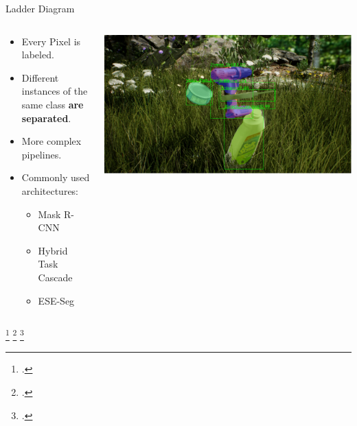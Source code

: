 \documentclass[18pt]{beamer}
\begin{document}
\begin{frame}{Ladder Diagram}
\begin{columns}
	\begin{column}{0.5\textwidth}
		\begin{itemize}
			\item Every Pixel is labeled.
			\item Different instances of the same class \textbf{are separated}.
			\item More complex pipelines.
			\item Commonly used architectures:
			\begin{itemize}
				\item Mask R-CNN~\footnotemark
				\item Hybrid Task Cascade~\footnotemark
				\item ESE-Seg~\footnotemark
			\end{itemize}
		\end{itemize}
	\end{column}
	\begin{column}{0.5\textwidth}
		\includegraphics[width=\textwidth]{figures/cmrcnn_mobilenet_fat.pdf}
	\end{column}
\end{columns}
\footcitetext{DBLP:journals/corr/HeGDG17}
\footcitetext{DBLP:journals/corr/abs-1901-07518}
\footcitetext{2019arXiv190804067X}
\end{frame}
\end{document}
